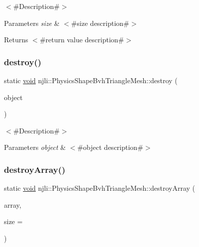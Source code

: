 $<$\#\+Description\#$>$


\begin{DoxyParams}{Parameters}
{\em size} & $<$\#size description\#$>$\\
\hline
\end{DoxyParams}
\begin{DoxyReturn}{Returns}
$<$\#return value description\#$>$ 
\end{DoxyReturn}
\mbox{\label{classnjli_1_1_physics_shape_bvh_triangle_mesh_a7a04fd696544a8e1cdee9d307a1bce67}} 
\subsubsection{\texorpdfstring{destroy()}{destroy()}}
{\footnotesize\ttfamily static \mbox{\hyperlink{_thread_8h_af1e856da2e658414cb2456cb6f7ebc66}{void}} njli\+::\+Physics\+Shape\+Bvh\+Triangle\+Mesh\+::destroy (\begin{DoxyParamCaption}\item[{\mbox{\hyperlink{classnjli_1_1_physics_shape_bvh_triangle_mesh}{Physics\+Shape\+Bvh\+Triangle\+Mesh}} $\ast$}]{object }\end{DoxyParamCaption})\hspace{0.3cm}{\ttfamily [static]}}

$<$\#\+Description\#$>$


\begin{DoxyParams}{Parameters}
{\em object} & $<$\#object description\#$>$ \\
\hline
\end{DoxyParams}
\mbox{\label{classnjli_1_1_physics_shape_bvh_triangle_mesh_a98bbf411e994ce5db281ad080b33382b}} 
\subsubsection{\texorpdfstring{destroy\+Array()}{destroyArray()}}
{\footnotesize\ttfamily static \mbox{\hyperlink{_thread_8h_af1e856da2e658414cb2456cb6f7ebc66}{void}} njli\+::\+Physics\+Shape\+Bvh\+Triangle\+Mesh\+::destroy\+Array (\begin{DoxyParamCaption}\item[{\mbox{\hyperlink{classnjli_1_1_physics_shape_bvh_triangle_mesh}{Physics\+Shape\+Bvh\+Triangle\+Mesh}} $\ast$$\ast$}]{array,  }\item[{const \mbox{\hyperlink{_util_8h_a10e94b422ef0c20dcdec20d31a1f5049}{u32}}}]{size = {} }\end{DoxyParamCaption})\hspace{0.3cm}{\ttfamily [static]}}

